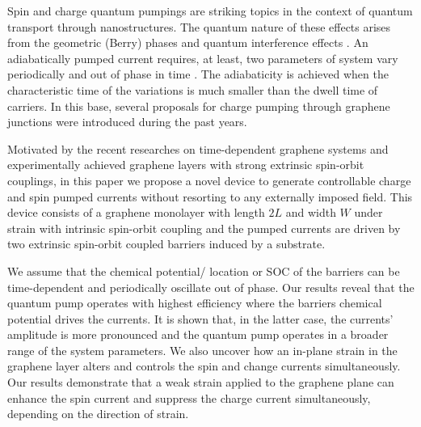 \documentclass[doublecol]{epl2}
\begin{document}
Spin and charge quantum pumpings are striking topics in the context of quantum transport through
nanostructures. The quantum nature of these effects arises from the geometric (Berry) phases and quantum
interference effects \cite{cite:Makhlin01}. An adiabatically pumped current requires, at least, two parameters
of system vary periodically and out of phase in time \cite{cite:Brouwer98}. The adiabaticity is achieved when
the characteristic time of the variations is much smaller than the dwell time of carriers. In this base,
several proposals for charge pumping through graphene junctions were introduced during the past
years\cite{cite:Pradaprb09,cite:Grichuk13,cite:Zhu09,cite:Low12,
cite:abdollahipour14,Benjamin,pmp1,pmp2,pmp3}.

Motivated by the recent researches on time-dependent graphene
systems\cite{cite:Pradaprb09,cite:Grichuk13,cite:Zhu09,cite:Low12,
cite:abdollahipour14,Benjamin,pmp1,pmp2,pmp3} and experimentally achieved graphene layers with strong
extrinsic spin-orbit couplings\cite{cite:Avsar14,so_exp1,so_exp2}, in this paper we propose a novel device to
generate controllable charge and spin pumped currents without resorting to any externally imposed field. This
device consists of a graphene monolayer with length $2L$ and width $W$ under strain with intrinsic spin-orbit
coupling and the pumped currents are driven by two extrinsic spin-orbit coupled barriers induced by a
substrate\cite{cite:Avsar14}.

We assume that the chemical potential/ location or SOC of the barriers can be time-dependent and periodically
oscillate out of phase. Our results reveal that the quantum pump operates with highest efficiency where the
barriers chemical potential drives the currents. It is shown that, in the latter case, the currents' amplitude
is more pronounced and the quantum pump operates in a broader range of the system parameters. We also uncover
how an in-plane strain in the graphene layer alters and controls the spin and change currents simultaneously.
Our results demonstrate that a weak strain applied to the graphene plane can enhance the spin current and
suppress the charge current simultaneously, depending on the direction of strain.
\end{document}
